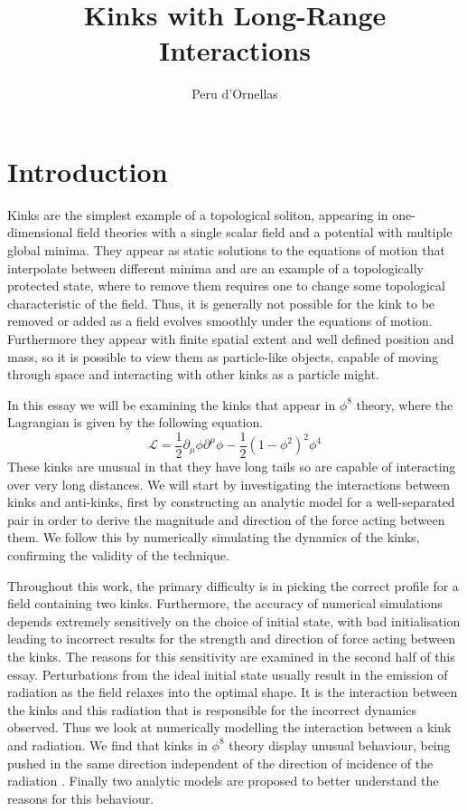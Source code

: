 \documentclass[11pt, oneside]{article}  	%
\title{Kinks with Long-Range Interactions}
\author{Peru d'Ornellas}
\date{}							%
\numberwithin{equation}{section}
\begin{document}
\maketitle


\section{Introduction}
Kinks are the simplest example of a topological soliton, appearing in one-dimensional field theories with a single scalar field and a potential with multiple global minima. They appear as static solutions to the equations of motion that interpolate between different minima and are an example of a topologically protected state, where to remove them requires one to change some topological characteristic of the field. Thus, it is generally not possible for the kink to be removed or added as a field evolves smoothly under the equations of motion. Furthermore they appear with finite spatial extent and well defined position and mass, so it is possible to view them as particle-like objects, capable of moving through space and interacting with other kinks as a particle might.\par
In this essay we will be examining the kinks that appear in $\phi^8$ theory, where the Lagrangian is given by the following equation.
\begin{equation}
\mathcal{L} = \frac{1}{2} \partial_\mu \phi \partial^\mu \phi  - \frac{1}{2} \left ( 1- \phi^2 \right )^2 \phi^4
\end{equation}
These kinks are unusual in that they have long tails so are capable of interacting over very long distances. We will start by investigating the interactions between kinks and anti-kinks, first by constructing an analytic model for a well-separated pair in order to derive the magnitude and direction of the force acting between them. We follow this by numerically simulating the dynamics of the kinks, confirming the validity of the technique.\par
Throughout this work, the primary difficulty is in picking the correct profile for a field containing two kinks. Furthermore, the accuracy of numerical simulations depends extremely sensitively on the choice of initial state, with bad initialisation leading to incorrect results for the strength and direction of force acting between the kinks. The reasons for this sensitivity are examined in the second half of this essay. Perturbations from the ideal initial state usually result in the emission of radiation as the field relaxes into the optimal shape. It is the interaction between the kinks and this radiation that is responsible for the incorrect dynamics observed. Thus we look at numerically modelling the interaction between a kink and radiation. We find that kinks in $\phi^8$ theory display unusual behaviour, being pushed in the same direction independent of the direction of incidence of the radiation . Finally two analytic models are proposed to better understand the reasons for this behaviour.
\end{document}
